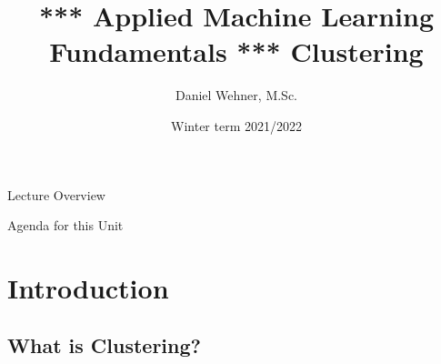 


\title[Clustering]{*** Applied Machine Learning Fundamentals *** Clustering}
\author{Daniel Wehner, M.Sc.}
\date{Winter term 2021/2022}




\maketitlepage


\begin{frame}{Lecture Overview}{}
\end{frame}


\begin{frame}{Agenda for this Unit}
	\begin{multicols}{2}
		\tableofcontents
	\end{multicols}
\end{frame}


\section{Introduction}

\subsection{What is Clustering?}

